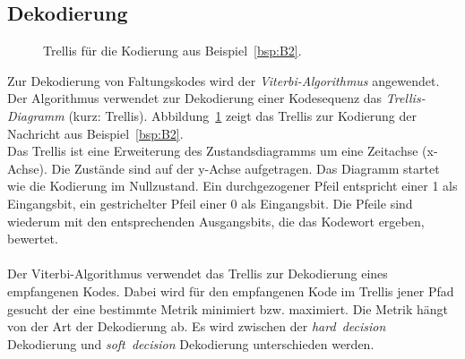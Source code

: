 \subsection{Dekodierung}
\label{kapitel:grundlagen_dekodierung}
\begin{figure}[t]
	\centering
		
\caption{Trellis für die Kodierung aus Beispiel~\ref{bsp:B2}.}
\label{abb:trellis_kodierung}
\end{figure}
Zur Dekodierung von Faltungskodes wird der \emph{Viterbi-Algorithmus} angewendet. Der Algorithmus verwendet zur Dekodierung einer Kodesequenz das \emph{Trellis-Diagramm} (kurz: Trellis). Abbildung~\ref{abb:trellis_kodierung} zeigt das Trellis zur Kodierung der Nachricht aus Beispiel~\ref{bsp:B2}.
\\
Das Trellis ist eine Erweiterung des Zustandsdiagramms um eine Zeitachse (x-Achse). Die Zustände sind auf der y-Achse aufgetragen. Das Diagramm startet wie die Kodierung im Nullzustand. Ein durchgezogener Pfeil entspricht einer 1 als Eingangsbit, ein gestrichelter Pfeil einer 0 als Eingangsbit. Die Pfeile sind wiederum mit den entsprechenden Ausgangsbits, die das Kodewort ergeben, bewertet.
\\
\\
Der Viterbi-Algorithmus verwendet das Trellis zur Dekodierung eines empfangenen Kodes. Dabei wird für den empfangenen Kode im Trellis jener Pfad gesucht der eine bestimmte Metrik minimiert bzw. maximiert. Die Metrik hängt von der Art der Dekodierung ab. Es wird zwischen der \emph{hard~decision} Dekodierung und \emph{soft~decision} Dekodierung unterschieden werden.

